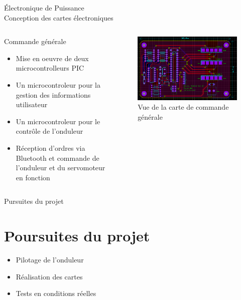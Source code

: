 \documentclass{beamer}
\begin{document}
	\begin{frame}{Électronique de Puissance\\ Conception des cartes électroniques}
		\begin{columns}[T]
	  		\begin{column}{0.5\textwidth}
	  			Commande générale
		    	\begin{itemize}
		    		\item Mise en oeuvre de deux microcontrolleurs PIC
		    		\item Un microcontroleur pour la gestion des informations utilisateur
		    		\item Un microcontroleur pour le contrôle de l'onduleur
		    		\item Réception d'ordres via Bluetooth et commande de l'onduleur et du servomoteur en fonction
		    	\end{itemize}
	  		\end{column}
	  		\begin{column}{0.5\textwidth}
	  			\begin{figure}
	  				\begin{center}
	  					\includegraphics[height=0.4\textheight]{../Illus/PCB_Onduleur.PNG}
	  				\end{center}
	    			\caption{Vue de la carte de commande générale}
	    		\end{figure}
	  		\end{column}
		\end{columns}
	\end{frame}
	
	\begin{frame}{Pursuites du projet}
		\section[Poursuites]{Poursuites du projet}
		\begin{itemize}
		    \item Pilotage de l'onduleur
		    \item Réalisation des cartes	
		    \item Tests en conditions réelles
		\end{itemize}
	\end{frame}
	
\end{document}
